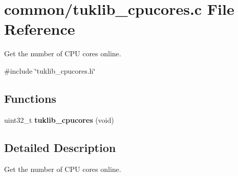\section{common/tuklib\+\_\+cpucores.c File Reference}
\label{tuklib__cpucores_8c}


Get the number of C\+PU cores online.  


{\ttfamily \#include \char`\"{}tuklib\+\_\+cpucores.\+h\char`\"{}}\newline
\subsection*{Functions}
\begin{DoxyCompactItemize}
\item 
\mbox{\label{tuklib__cpucores_8c_a29a46012d8b74be2f52214798c17dd79}} 
uint32\+\_\+t {\bfseries tuklib\+\_\+cpucores} (void)
\end{DoxyCompactItemize}


\subsection{Detailed Description}
Get the number of C\+PU cores online. 

